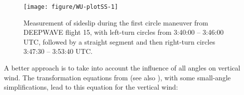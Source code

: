 \documentclass[12pt,twoside,english]{article}\usepackage[]{graphicx}\usepackage[]{color}
\newenvironment{knitrout}{}{} %
\begin{document}
\begin{knitrout}\footnotesize
{}\color{fgcolor}\begin{figure}

{\centering \texttt{[image: figure/WU-plotSS-1]} 

}

\caption[Measurement of sideslip during the first circle maneuver from DEEPWAVE fight 15.]{Measurement of sideslip during the first circle maneuver from DEEPWAVE flight 15, with left-turn circles from 3:40:00 -- 3:46:00 UTC, followed by a straight segment and then right-turn circles 3:47:30 -- 3:53:40 UTC.}\label{fig:plotSS}
\end{figure}


\end{knitrout}

A better approach is to take into account the influence of all angles on vertical wind. The transformation equations from \citet{Bulletin23} (see also \citet{NCAR_OpenSky_TECH-NOTE-000-000-000-064}), with some small-angle simplifications, lead to this equation for the vertical wind: 
\end{document}
